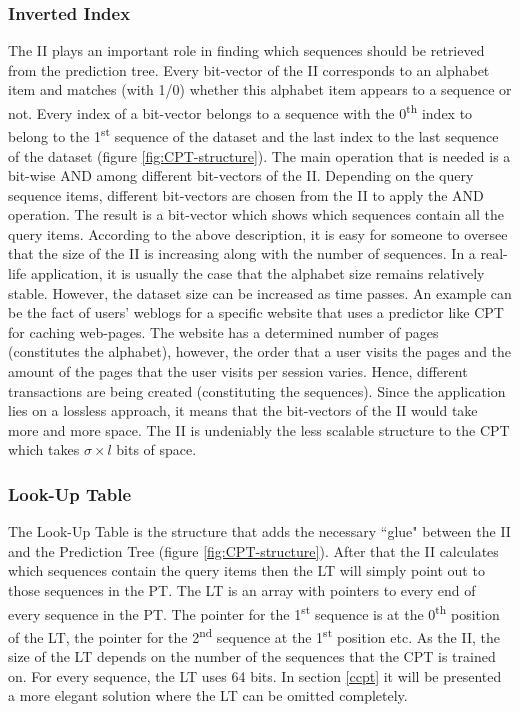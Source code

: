 \subsubsection*{Inverted Index}
The II plays an important role in finding which sequences should be retrieved from the prediction tree. Every bit-vector of the II corresponds to an alphabet item and matches (with 1/0) whether this alphabet item appears to a sequence or not. Every index of a bit-vector belongs to a sequence with the 0\textsuperscript{th} index to belong to the 1\textsuperscript{st} sequence of the dataset and the last index to the last sequence of the dataset (figure \ref{fig:CPT-structure}). The main operation that is needed is a bit-wise AND among different bit-vectors of the II. Depending on the query sequence items, different bit-vectors are chosen from the II to apply the AND operation. The result is a bit-vector which shows which sequences contain all the query items. According to the above description, it is easy for someone to oversee that the size of the II is increasing along with the number of sequences. In a real-life application, it is usually the case that the alphabet size remains relatively stable. However, the dataset size can be increased as time passes. An example can be the fact of users' weblogs for a specific website that uses a predictor like CPT for caching web-pages. The website has a determined number of pages (constitutes the alphabet), however, the order that a user visits the pages and the amount of the pages that the user visits per session varies. Hence, different transactions are being created (constituting the sequences). Since the application lies on a lossless approach, it means that the bit-vectors of the II would take more and more space. The II is undeniably the less scalable structure to the CPT which takes \(\sigma \times l\) bits of space.

\subsubsection*{Look-Up Table}
The Look-Up Table is the structure that adds the necessary ``glue" between the II and the Prediction Tree (figure \ref{fig:CPT-structure}). After that the II calculates which sequences contain the query items then the LT will simply point out to those sequences in the PT. The LT is an array with pointers to every end of every sequence in the PT. The pointer for the 1\textsuperscript{st} sequence is at the 0\textsuperscript{th} position of the LT, the pointer for the 2\textsuperscript{nd} sequence at the 1\textsuperscript{st} position etc. As the II, the size of the LT depends on the number of the sequences that the CPT is trained on. For every sequence, the LT uses 64 bits. In section \ref{ccpt} it will be presented a more elegant solution where the LT can be omitted completely.

